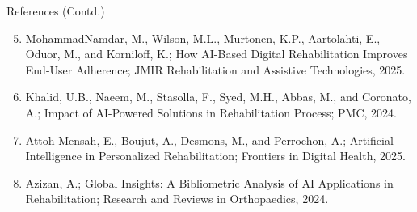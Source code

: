 \documentclass[10pt]{beamer}
\begin{document}
\begin{frame}{References (Contd.)}
\footnotesize
\begin{enumerate}
\setcounter{enumi}{4}
\item MohammadNamdar, M., Wilson, M.L., Murtonen, K.P., Aartolahti, E., Oduor, M., and Korniloff, K.; How AI-Based Digital Rehabilitation Improves End-User Adherence; JMIR Rehabilitation and Assistive Technologies, 2025.

\item Khalid, U.B., Naeem, M., Stasolla, F., Syed, M.H., Abbas, M., and Coronato, A.; Impact of AI-Powered Solutions in Rehabilitation Process; PMC, 2024.

\item Attoh-Mensah, E., Boujut, A., Desmons, M., and Perrochon, A.; Artificial Intelligence in Personalized Rehabilitation; Frontiers in Digital Health, 2025.

\item Azizan, A.; Global Insights: A Bibliometric Analysis of AI Applications in Rehabilitation; Research and Reviews in Orthopaedics, 2024.
\end{enumerate}
\end{frame}
\end{document}
